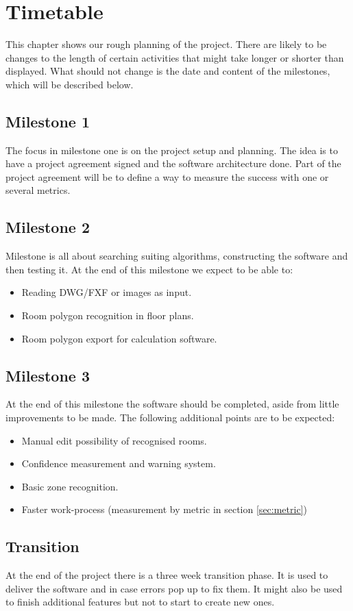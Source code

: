 \chapter{Timetable}

This chapter shows our rough planning of the project. There are likely to be changes to the length of certain activities that might take longer or shorter than displayed. What should not change is the date and content of the milestones, which will be described below.

\section{Milestone 1}
The focus in milestone one is on the project setup and planning. The idea is to have a project agreement signed and the software architecture done. Part of the project agreement will be to define a way to measure the success with one or several metrics.

\section{Milestone 2}
Milestone is all about searching suiting algorithms, constructing the software and then testing it. At the end of this milestone we expect to be able to:

\begin{itemize}
	\item Reading DWG/FXF or images as input.
	\item Room polygon recognition in floor plans.
	\item Room polygon export for calculation software.
\end{itemize}

\section{Milestone 3}
At the end of this milestone the software should be completed, aside from little improvements to be made. The following additional points are to be expected: 
\begin{itemize}
	\item Manual edit possibility of recognised rooms.
	\item Confidence measurement and warning system.
	\item Basic zone recognition.
	\item Faster work-process (measurement by metric in section \ref{sec:metric})
\end{itemize}

\section{Transition}
At the end of the project there is a three week transition phase. It is used to deliver the software and in case errors pop up to fix them. It might also be used to finish additional features but not to start to create new ones.